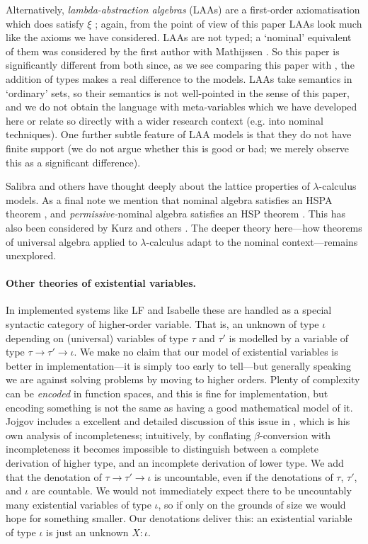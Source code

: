 \documentclass[submission,copyright]{eptcs}
\begin{document}
Alternatively, \emph{lambda-abstraction algebras} (LAAs) are a first-order axiomatisation which does satisfy $\xi$ \cite{salibra:appual}; again, from the point of view of this paper LAAs look much like the axioms we have considered.
LAAs are not typed; a `nominal' equivalent of them was considered by the first author with Mathijssen \cite{gabbay:nomalc}.  So this paper is significantly different from both since, as we see comparing this paper with \cite{gabbay:nomalc}, the addition of types makes a real difference to the models.
 LAAs take semantics in `ordinary' sets, so their semantics is not well-pointed in the sense of this paper, and we do not obtain the language with meta-variables which we have developed here or relate so directly with a wider research context (e.g. into nominal techniques).   One further subtle feature of LAA models is that they do not have finite support (we do not argue whether this is good or bad; we merely observe this as a significant difference).  

Salibra and others have thought deeply about the lattice properties of $\lambda$-calculus models.  As a final note we mention that nominal algebra satisfies an HSPA theorem \cite{gabbay:nomahs}, and \emph{permissive-}nominal algebra satisfies an HSP theorem \cite{gabbay:nomtnl}.  This has also been considered by Kurz and others \cite{kurz:unians}.  The deeper theory here---how theorems of universal algebra applied to $\lambda$-calculus adapt to the nominal context---remains unexplored. 

\paragraph{Other theories of existential variables.}
In implemented systems like LF and Isabelle \cite{PaulsonLC:fougtp} these are handled as a special syntactic category of higher-order variable.
That is, an unknown of type $\iota$ depending on (universal) variables of type $\tau$ and $\tau'$ is modelled by a variable of type $\tau\to\tau'\to\iota$.
We make no claim that our model of existential variables is better in implementation---it is simply too early to tell---but generally speaking we are against solving problems by moving to higher orders. 
Plenty of complexity can be \emph{encoded} in function spaces, and this is fine for implementation, but encoding something is not the same as having a good mathematical model of it. 
Jojgov includes a excellent and detailed discussion of this issue in \cite{jojgov:holbp}, which is his own analysis of incompleteness;
intuitively, by conflating $\beta$-conversion with incompleteness it becomes impossible to distinguish between a complete derivation of higher type, and an incomplete derivation of lower type.
We add that the denotation of $\tau\to\tau'\to\iota$ is uncountable, even if the denotations of $\tau$, $\tau'$, and $\iota$ are countable.
We would not immediately expect there to be uncountably many existential variables of type $\iota$, so if only on the grounds of size we would hope for something smaller.
Our denotations deliver this: an existential variable of type $\iota$ is just an unknown $X:\iota$. 
\end{document}
